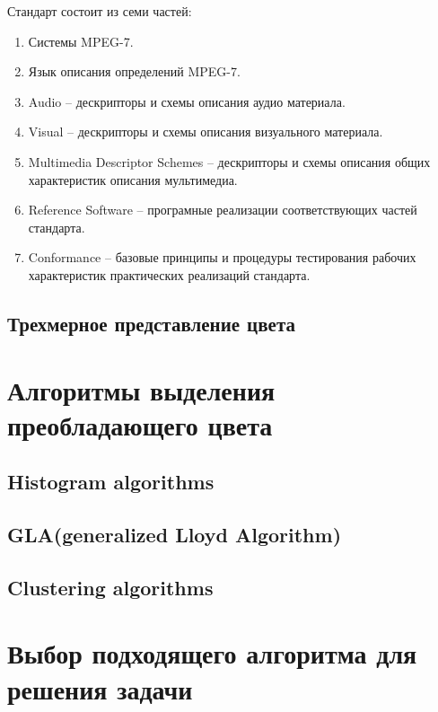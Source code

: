 Стандарт состоит из семи частей:
\begin{enumerate}
	\item Системы MPEG-7.
	\item Язык описания определений MPEG-7.
	\item Audio -- дескрипторы и схемы описания аудио материала.
	\item Visual -- дескрипторы и схемы описания визуального материала.
	\item Multimedia Descriptor Schemes -- дескрипторы и схемы описания общих характеристик описания мультимедиа.
	\item Reference Software -- програмные реализации соответствующих частей стандарта.
	\item Conformance -- базовые принципы и процедуры тестирования рабочих характеристик практических реализаций стандарта.
\end{enumerate}

\subsection{ Трехмерное представление цвета}

\section{ Алгоритмы выделения преобладающего цвета}
\subsection{ Histogram algorithms}
\subsection{ GLA(generalized Lloyd Algorithm)}
\subsection{ Clustering algorithms}

\section{ Выбор подходящего алгоритма для решения задачи}
